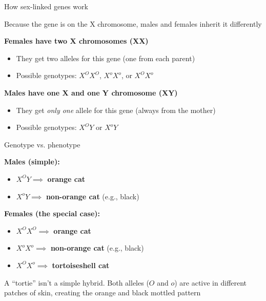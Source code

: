 \documentclass[aspectratio=169]{beamer}\usepackage[]{graphicx}\usepackage[]{xcolor}
\begin{document}
\begin{frame}{How sex-linked genes work}
    
    Because the gene is on the X chromosome, males and females inherit it differently
    
    \vfill
    
    \textbf{Females have two X chromosomes (XX)}
    \begin{itemize}
        \item They get two alleles for this gene (one from each parent)
        \item Possible genotypes: $X^O X^O$, $X^o X^o$, or $X^O X^o$
    \end{itemize}
    
    \vfill
    
    \textbf{Males have one X and one Y chromosome (XY)}
    \begin{itemize}
        \item They get \emph{only one} allele for this gene (always from the mother)
        \item Possible genotypes: $X^O Y$ or $X^o Y$
    \end{itemize}
    
\end{frame}

\begin{frame}{Genotype vs. phenotype}
    
    \textbf{Males (simple):}
    \begin{itemize}
        \item $X^O Y \implies$ \textbf{orange cat}
        \item $X^o Y \implies$ \textbf{non-orange cat} (e.g., black)
    \end{itemize}
    
    \vfill
    
    \textbf{Females (the special case):}
    \begin{itemize}
        \item $X^O X^O \implies$ \textbf{orange cat}
        \item $X^o X^o \implies$ \textbf{non-orange cat} (e.g., black)
        \item $X^O X^o \implies$ \textbf{tortoiseshell cat}
    \end{itemize}
    
    \vfill
    
    A ``tortie'' isn't a simple hybrid. Both alleles ($O$ and $o$) are active in different patches of skin, creating the orange and black mottled pattern

\end{frame}
\end{document}
